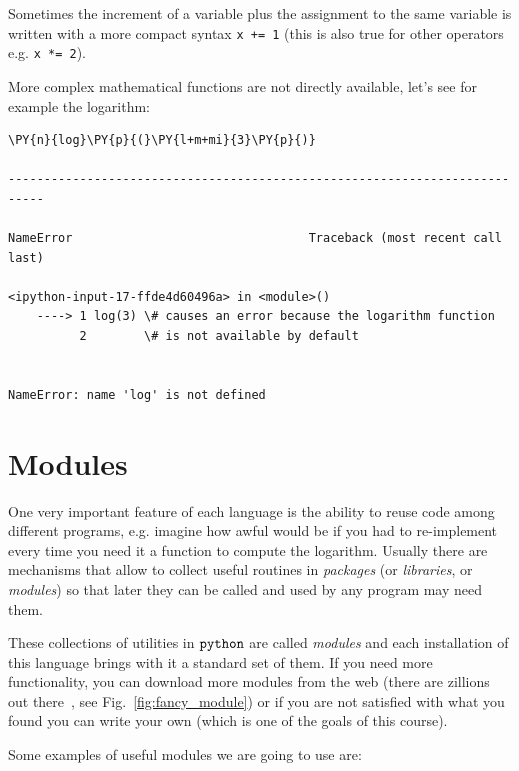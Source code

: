 Sometimes the increment of a variable plus the assignment to the same variable is written 
with a more compact syntax \texttt{x += 1} (this is also true for other operators e.g. \texttt{x *= 2}).

More complex mathematical functions are not directly available, let's see for example the logarithm:

\begin{tcolorbox}[breakable, size=fbox, boxrule=1pt, pad at break*=1mm, colback=cellbackground, colframe=cellborder]            
\begin{Verbatim}[commandchars=\\\{\}]
\PY{n}{log}\PY{p}{(}\PY{l+m+mi}{3}\PY{p}{)}

---------------------------------------------------------------------------

NameError                                 Traceback (most recent call last)

<ipython-input-17-ffde4d60496a> in <module>()
    ----> 1 log(3) \# causes an error because the logarithm function
          2        \# is not available by default


NameError: name 'log' is not defined
\end{Verbatim}
\end{tcolorbox}

\section{Modules}\label{modules}

One very important feature of each language is the ability to reuse code among 
different programs, e.g. imagine how awful would be if you had to re-implement every time 
you need it a function to compute the logarithm.
Usually there are mechanisms that allow to collect useful routines in \emph{packages} 
(or \emph{libraries}, or \emph{modules}) so that later they can be called and used by any 
program may need them.

These collections of utilities in \(\tt{python}\) are called \emph{modules} and each installation 
of this language brings with it a standard set of them. If you need more functionality, you can 
download more modules from the web (there are zillions out there~\cite{modules}, see Fig.~\ref{fig:fancy_module})
or if you are 
not satisfied with what you found you can write your own (which is one of the goals of this course).

Some examples of useful modules we are going to use are:

